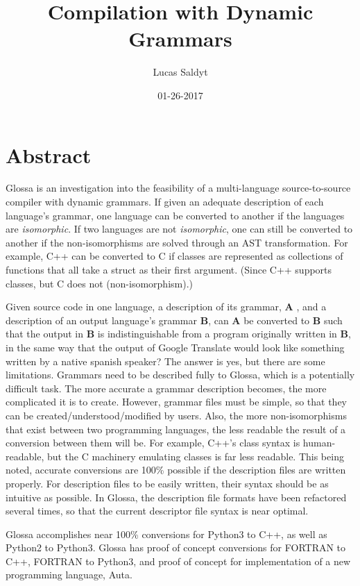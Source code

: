 \documentclass{article}
\title{Compilation with Dynamic Grammars}
\date{01-26-2017}
\author{Lucas Saldyt}
\begin{document}
\maketitle
{}
\newpage
{}

\section{Abstract}
Glossa is an investigation into the feasibility of a multi-language source-to-source compiler with dynamic grammars. 
If given an adequate description of each language's grammar, one language can be converted to another if the languages are \textit{isomorphic}.
If two languages are not \textit{isomorphic}, one can still be converted to another if the non-isomorphisms are solved through an AST transformation.
For example, C++ can be converted to C if classes are represented as collections of functions that all take a struct as their first argument. (Since C++ supports classes, but C does not (non-isomorphism).)

Given source code in one language, a description of its grammar, \textbf{A} , and a description of an output language's grammar \textbf{B}, can \textbf{A} be converted to \textbf{B} such that the output in \textbf{B} is indistinguishable from a program originally written in \textbf{B}, in the same way that the output of Google Translate would look like something written by a native spanish speaker?
The answer is yes, but there are some limitations. Grammars need to be described fully to Glossa, which is a potentially difficult task.
The more accurate a grammar description becomes, the more complicated it is to create.
However, grammar files must be simple, so that they can be created/understood/modified by users.
Also, the more non-isomorphisms that exist between two programming languages, the less readable the result of a conversion between them will be.
For example, C++'s class syntax is human-readable, but the C machinery emulating classes is far less readable. 
This being noted, accurate conversions are 100\% possible if the description files are written properly.
For description files to be easily written, their syntax should be as intuitive as possible. 
In Glossa, the description file formats have been refactored several times, so that the current descriptor file syntax is near optimal.

Glossa accomplishes near 100\% conversions for Python3 to C++, as well as Python2 to Python3.
Glossa has proof of concept conversions for FORTRAN to C++, FORTRAN to Python3, and proof of concept for implementation of a new programming language, Auta.
\end{document}

